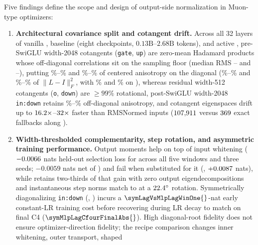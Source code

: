 Five findings define the scope and design of output-side normalization in
Muon-type optimizers:
\begin{enumerate}
\item \textbf{Architectural covariance split and cotangent drift.}
  Across all 32 layers of vanilla , baseline \muont{} (eight
  checkpoints, $0.13\text{B}$--$2.68\text{B}$ tokens), and active
  , pre-SwiGLU width-2048 cotangents (\texttt{gate},
  \texttt{up}) are zero-mean Hadamard products whose off-diagonal correlations
  sit on the sampling floor (median RMS
  \motWtOutGateCorrRmsMed{}--\motMuonOutGateCorrRmsMed{} and
  \motMuonOutUpCorrRmsMed{}--\motWtOutUpCorrRmsMed{}), putting
  \motMuonOutGateDiagAnisoMedPct\%--\motWtOutGateDiagAnisoMedPct\% and
  \motMuonOutUpDiagAnisoMedPct\%--\motWtOutUpDiagAnisoMedPct\% of centered
  anisotropy on the diagonal (\motOutGateExpVarLMedPct\%--\motMuonOutGateExpVarLMedPct\%
  and \motOutUpExpVarLMedPct\%--\motMuonOutUpExpVarLMedPct\% of $\|L - I\|_F^2$,
  with \motWtOutGateExpVarLMedPct\% and \motWtOutUpExpVarLMedPct\% on
  ), whereas residual width-512 cotangents (\texttt{o},
  \texttt{down}) are $\ge 99\%$ rotational, post-SwiGLU width-2048
  \texttt{in:down} retains
  \motInDownOffdiagAnisoMedPct\%--\motMuonInDownOffdiagAnisoMedPct\%
  off-diagonal anisotropy, and cotangent eigenspaces drift up to
  $16.2\times$--$32\times$
  faster than RMSNormed inputs ($107{,}911{}$ versus $369{}$
  exact fallbacks along ).
\item \textbf{Width-thresholded complementarity, step rotation, and asymmetric
  training performance.}
  Output moments help on top of input whitening ($-0.0066{}$ nats held-out
  selection loss for  across all five windows and three seeds;
  $-0.0059$ nats net of ) and fail when substituted for it
  (, $+0.0087{}$ nats), while  retains
  two-thirds of that gain with zero output eigendecompositions and instantaneous
  step norms match  to \mechMlpdiagGraftNorm{} at a
  $22.4^\circ$ rotation. Symmetrically diagonalizing
  \texttt{in:down} (, ) incurs a
  $\symLagVsMlpLagWinOne{}$-nat early
  constant-LR training cost before recovering during LR decay to match
   on final C4 ($\symMlpLagCfourFinalAbs{}$).
  High diagonal-root fidelity does not ensure optimizer-direction fidelity;
  the recipe comparison changes inner whitening, outer transport, shaped

\end{enumerate}
